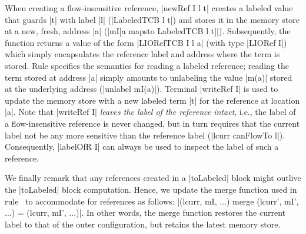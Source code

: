 %
When creating a flow-insensitive reference, |newRef I l t| creates a labeled
value that guards |t| with label |l| (|LabeledTCB l t|) and stores it in the
memory store at a new, fresh, address |a| (|mI[a mapsto LabeledTCB l t]|).
%
Subsequently, the function returns a value of the form |LIORefTCB I l a| (with type
|LIORef I|) which simply encapsulates the reference label and address where the
term is stored.
%
Rule  specifies the semantics for reading a
labeled reference; reading the term stored at address |a| simply
amounts to unlabeling the value |m(a)| stored at the underlying
address (|unlabel mI(a)|).
%
Terminal |writeRef I| is used to update the memory store with a new labeled term
|t| for the reference at location |a|.
%
Note that |writeRef I| \emph{leaves the label of the reference intact}, i.e., the
label of a flow-insensitive reference is never changed, but in turn requires
that the current label not be any more sensitive than the reference label
(|lcurr canFlowTo l|).
%
Consequently, |labelOfR I| can always be used to inspect the label of such a
reference.
%

We finally remark that any references created in a |toLabeled| block might 
outlive the |toLabeled| block computation.
%
Hence, we update the merge function used in rule~ to
accommodate for references as follows:
|(lcurr, mI, ...) merge (lcurr', mI', ...) = (lcurr, mI', ...)|.
%
In other words, the merge function restores the current label to that of the
outer configuration, but retains the latest memory store.



